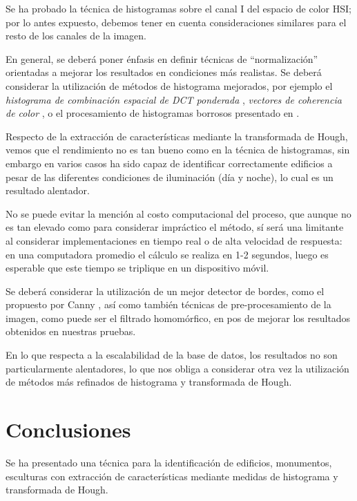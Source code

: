 \documentclass[conference,spanish,a4paper,10pt,oneside,final]{tfmpd}
\begin{document}
Se ha probado la técnica de histogramas sobre el canal I del espacio de color
HSI; por lo antes expuesto, debemos tener en cuenta consideraciones similares
para el resto de los canales de la imagen.

En general, se deberá poner énfasis en definir técnicas
de ``normalización'' orientadas a mejorar los resultados en condiciones más
realistas. Se deberá considerar la utilización de métodos de histograma
mejorados, por ejemplo el \emph{histograma de combinación espacial de DCT
ponderada} \cite{wdctsch}, \emph{vectores de coherencia de
color} \cite{Pass96histogramrefinement}, o el procesamiento de
histogramas borrosos presentado en \cite{Konstantinidis2005375}.

Respecto de la extracción de características mediante la transformada de Hough,
vemos que el rendimiento no es tan bueno como en la técnica de histogramas,
sin embargo en varios casos ha sido capaz de identificar correctamente edificios
a pesar de las diferentes condiciones de iluminación (día y noche), lo cual
es un resultado alentador.

No se puede evitar la mención al costo computacional del proceso, que aunque
no es tan elevado como para considerar impráctico el método, sí será una
limitante al considerar implementaciones en tiempo real o de alta velocidad
de respuesta: en una computadora promedio el cálculo se realiza en 1-2 segundos,
luego es esperable que este tiempo se triplique en un dispositivo móvil.

Se deberá considerar la utilización de un mejor detector de bordes, como el
propuesto por Canny \cite{canny}%
, así como también técnicas de pre-procesamiento de la
imagen, como puede ser el filtrado homomórfico, en pos de mejorar los
resultados obtenidos en nuestras pruebas.

En lo que respecta a la escalabilidad de la base de datos, los resultados no
son particularmente alentadores, lo que nos obliga a considerar otra vez la
utilización de métodos más refinados de histograma y transformada de Hough.
%
%
%
%
\section{Conclusiones}
Se ha presentado una técnica para la identificación de edificios, monumentos,
esculturas con extracción de características mediante medidas de histograma
y transformada de Hough.
\end{document}
